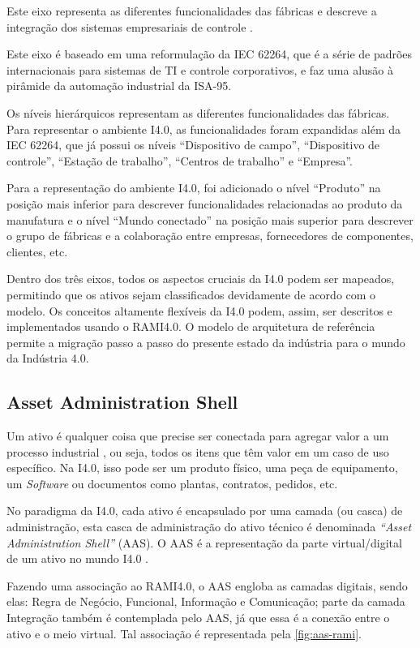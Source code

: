 	Este eixo representa as diferentes funcionalidades das fábricas e descreve a integração dos sistemas empresariais de controle \cite{pisching2018arquitetura}.
	
	Este eixo é baseado em uma reformulação da IEC 62264, que é a série de padrões internacionais para sistemas de TI e controle corporativos, e faz uma alusão à pirâmide da automação industrial da ISA-95.
	
	Os níveis hierárquicos representam as diferentes funcionalidades das fábricas. Para representar o ambiente I4.0, as funcionalidades foram expandidas além da IEC 62264, que já possui os níveis ``Dispositivo de campo'', ``Dispositivo de controle'', ``Estação de trabalho'', ``Centros de trabalho'' e ``Empresa''.
	
	Para a representação do ambiente I4.0, foi adicionado o nível ``Produto'' na posição mais inferior para descrever funcionalidades relacionadas ao produto da manufatura e o nível ``Mundo conectado'' na posição mais superior para descrever o grupo de fábricas e a colaboração entre empresas, fornecedores de componentes, clientes, etc. 
	
	Dentro dos três eixos, todos os aspectos cruciais da I4.0 podem ser mapeados, permitindo que os ativos sejam classificados devidamente de acordo com o modelo. Os conceitos altamente flexíveis da I4.0 podem, assim, ser descritos e implementados usando o RAMI4.0. O modelo de arquitetura de referência permite a migração passo a passo do presente estado da indústria para o mundo da Indústria 4.0.
	
	\subsection{Asset Administration Shell}
	
	Um ativo é qualquer coisa que precise ser conectada para agregar valor a um processo industrial \cite{bader2019aas}, ou seja, todos os itens que têm valor em um caso de uso específico. Na I4.0, isso pode ser um produto físico, uma peça de equipamento, um \textit{Software} ou documentos como plantas, contratos, pedidos, etc.
	
	No paradigma da I4.0, cada ativo é encapsulado por uma camada (ou casca) de administração, esta casca de administração do ativo técnico é denominada \textit{``Asset Administration Shell''} (AAS). O AAS é a representação da parte virtual/digital de um ativo no mundo I4.0 \cite{ye2019aas}.
	
	Fazendo uma associação ao RAMI4.0, o AAS engloba as camadas digitais, sendo elas: Regra de Negócio, Funcional, Informação e Comunicação; parte da camada Integração também é contemplada pelo AAS, já que essa é a conexão entre o ativo e o meio virtual. Tal associação é representada pela \autoref{fig:aas-rami}.


